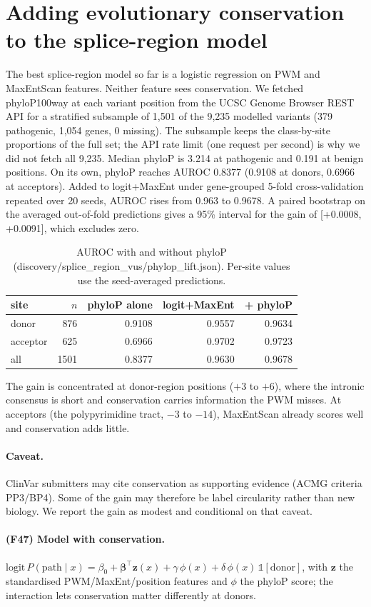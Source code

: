 \section{Adding evolutionary conservation to the splice-region model}
The best splice-region model so far is a logistic regression on PWM and MaxEntScan features. Neither feature sees conservation. We fetched phyloP100way at each variant position from the UCSC Genome Browser REST API for a stratified subsample of 1,501 of the 9,235 modelled variants (379 pathogenic, 1,054 genes, 0 missing). The subsample keeps the class-by-site proportions of the full set; the API rate limit (one request per second) is why we did not fetch all 9,235.
Median phyloP is 3.214 at pathogenic and 0.191 at benign positions. On its own, phyloP reaches AUROC 0.8377 (0.9108 at donors, 0.6966 at acceptors). Added to logit+MaxEnt under gene-grouped 5-fold cross-validation repeated over 20 seeds, AUROC rises from 0.963 to 0.9678. A paired bootstrap on the averaged out-of-fold predictions gives a 95\% interval for the gain of [+0.0008, +0.0091], which excludes zero.
\begin{table}[h]\centering\small\begin{tabular}{lrrrr}\hline site & $n$ & phyloP alone & logit+MaxEnt & + phyloP\\\hline
donor & 876 & 0.9108 & 0.9557 & 0.9634\\
acceptor & 625 & 0.6966 & 0.9702 & 0.9723\\
all & 1501 & 0.8377 & 0.9630 & 0.9678\\
\hline\end{tabular}\caption{AUROC with and without phyloP (discovery/splice\_region\_vus/phylop\_lift.json). Per-site values use the seed-averaged predictions.}\end{table}
The gain is concentrated at donor-region positions ($+3$ to $+6$), where the intronic consensus is short and conservation carries information the PWM misses. At acceptors (the polypyrimidine tract, $-3$ to $-14$), MaxEntScan already scores well and conservation adds little.
\paragraph{Caveat.} ClinVar submitters may cite conservation as supporting evidence (ACMG criteria PP3/BP4). Some of the gain may therefore be label circularity rather than new biology. We report the gain as modest and conditional on that caveat.
\paragraph{(F47) Model with conservation.} $\mathrm{logit}\,P(\mathrm{path}\mid x)=\beta_0+\boldsymbol\beta^\top\mathbf z(x)+\gamma\,\phi(x)+\delta\,\phi(x)\,\mathbb 1[\mathrm{donor}]$, with $\mathbf z$ the standardised PWM/MaxEnt/position features and $\phi$ the phyloP score; the interaction lets conservation matter differently at donors.
